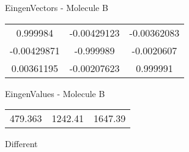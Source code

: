 \begin{multicols}{2}
\begin{center}
\vtab
 EingenVectors - Molecule B     \\
\vtab
\begin{tabular}{|c c c|}
0.999984	 & 	-0.00429123	 & 	-0.00362083	 \\
-0.00429871	 & 	-0.999989	 & 	-0.0020607	 \\
0.00361195	 & 	-0.00207623	 & 	0.999991
\end{tabular}

\vtab
 EingenValues - Molecule B     \\
\vtab
\begin{tabular}{|c c c|}
479.363	 & 	1242.41	 & 	1647.39	 \\
\end{tabular}

\end{center}
\end{multicols}
\begin{center}
\vtab
\vtab
\textcolor{NavyBlue}{\Large Different}
\end{center}

 \newpage

